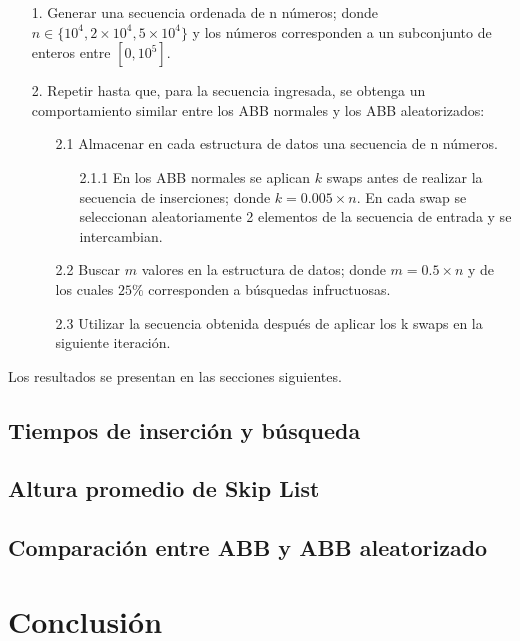 \documentclass[12pt,letterpaper]{article}
\begin{document}
\begin{itemize}
\item[1.] Generar una secuencia ordenada de n números; donde $n \in \{10^{4}, 2 \times 10^{4} , 5 \times 10^{4}\}$ y los números corresponden a un subconjunto de enteros entre $[0, 10^{5}]$.
\item[2.] Repetir hasta que, para la secuencia ingresada, se obtenga un comportamiento similar entre los ABB normales y los ABB aleatorizados:
	\begin{itemize}
	\item[2.1] Almacenar en cada estructura de datos una secuencia de n números.
		\begin{itemize}
		\item[2.1.1] En los ABB normales se aplican $k$ swaps antes de realizar la secuencia de inserciones; donde $k = 0.005 \times n$. En cada swap se seleccionan aleatoriamente 2 elementos de la secuencia de entrada y se intercambian.
		\end{itemize}
	\item[2.2] Buscar $m$ valores en la estructura de datos; donde $m = 0.5 \times n$ y de los cuales $25\%$ corresponden a búsquedas infructuosas.
	\item[2.3] Utilizar la secuencia obtenida después de aplicar los k swaps en la siguiente iteración.
	\end{itemize}
\end{itemize}

Los resultados se presentan en las secciones siguientes.

\subsection{Tiempos de inserción y búsqueda}
\subsection{Altura promedio de Skip List}
\subsection{Comparación entre ABB y ABB aleatorizado}
\section{Conclusión}


\end{document}
